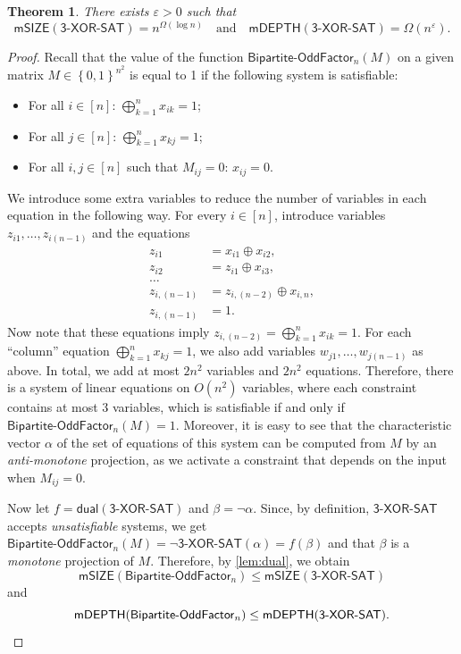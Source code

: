 \documentclass[10pt,a4paper]{article}
\newtheorem{theorem}{Theorem}[section]
\newcommand{\eps}{\varepsilon}
\newcommand{\txorsat}{\mathsf{3\mbox{-}XOR\mbox{-}SAT}}
\newcommand{\Cmon}[1]{\mathsf{mSIZE}({#1})}
\newcommand{\mdepth}[1]{\mathsf{mDEPTH}({#1})}
\newcommand{\set}[1]{\left\{#1\right\}}
\newcommand{\blt}{\set{0,1}}
\newcommand{\xor}{\oplus}
\newcommand{\bigxor}{\bigoplus}
\newcommand{\OddFactor}{\mathsf{OddFactor}}
\newcommand{\BipOddFactor}{\mathsf{Bipartite}\text{-}\OddFactor}
\newcommand{\dual}{\mathsf{dual}}
\begin{document}
\begin{theorem}
    \label{thm:xorsat-lb}
    There exists $\eps > 0$
    such that
    $$\Cmon{\txorsat} = n^{\Omega(\log n)}
    \quad \text{and} \quad 
    \mdepth{\txorsat} = \Omega(n^\eps).$$
\end{theorem}
\begin{proof}
    Recall that the
    value of the function
    $\BipOddFactor_n(M)$ on a given matrix
    $M \in \blt^{n^2}$ is equal to 1 if the following system is
    satisfiable:
    \begin{itemize}
        \item For all $i \in [n]$:
            $\bigxor_{k=1}^n x_{ik} = 1$;
        \item For all $j \in [n]$:
            $\bigxor_{k=1}^n x_{kj} = 1$;
        \item For all $i,j \in [n]$ such that $M_{ij} = 0$:
            $x_{ij} = 0$.
    \end{itemize}
    We introduce some extra variables to reduce the number of variables in
    each equation in the following way.
    For every $i \in [n]$,
    introduce variables 
    $z_{i1},\dots,z_{i(n-1)}$
    and the equations
    \begin{align*}
        z_{i1} 
        &= 
        x_{i1} \xor x_{i2},
        \\
        z_{i2} 
        &= 
        z_{i1} \xor x_{i3},
        \\
        \dots
        \\
        z_{i,(n-1)} 
        &= 
        z_{i,(n-2)} \xor x_{i,n},
        \\
        z_{i,(n-1)}
        &= 
        1.
    \end{align*}
    Now note that these equations imply
    $z_{i,(n-2)} = \bigxor_{k=1}^n x_{ik} = 1$.
    For each ``column'' equation
    $\bigxor_{k=1}^n x_{kj} = 1$,
    we also add variables
    $w_{j1},\dots, w_{j(n-1)}$ as above.
    In total, we add
    at most
    $2n^2$ variables
    and
    $2n^2$ equations.
    Therefore, there is a system of linear equations
    on $O(n^2)$ variables, where each constraint contains at most $3$ variables, which is satisfiable
    if and only if
    $\BipOddFactor_n(M)=1$.
    Moreover, it is easy to see that the characteristic vector $\alpha$
    of the set of 
    equations of this system
    can be computed from $M$
    by an \emph{anti-monotone} projection, as we activate a constraint that depends on the input when $M_{ij} = 0$.

    Now let 
    $f = \dual(\txorsat)$ and $\beta = \neg \alpha$. Since, by definition, $\txorsat$ accepts \emph{unsatisfiable} systems,
    we get $\BipOddFactor_n(M) = \neg \txorsat(\alpha) = f(\beta)$ and
    that $\beta$ is a \emph{monotone} projection of $M$.
    Therefore, by \cref{lem:dual},
    we obtain
    \begin{equation*}
        \Cmon{\BipOddFactor_n} \leq \Cmon{\txorsat}
    \end{equation*}
    and
    \begin{equation*}
        \mdepth{\BipOddFactor_n} \leq \mdepth{\txorsat}.
        \qedhere
    \end{equation*}
\end{proof}
\end{document}
